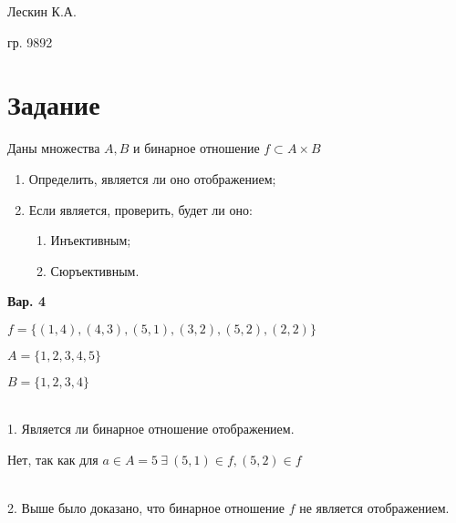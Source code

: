 Лескин К.А.

гр. 9892

\section*{Задание}

Даны множества $ A, B $ и бинарное отношение $ f \subset A \times B $

\begin{enumerate}
	\item Определить, является ли оно отображением;
	\item Если является, проверить, будет ли оно:
	\begin{enumerate}
		\item Инъективным;
		\item Сюръективным.
	\end{enumerate}
\end{enumerate}

\textbf{Вар. 4}

$ f = \{(1, 4),(4, 3),(5, 1),(3, 2),(5, 2),(2, 2)\} $

$ A = \{1, 2, 3, 4, 5\} $

$ B = \{1, 2, 3, 4\} $

\ 
\\

1. Является ли бинарное отношение отображением.

Нет, так как для $ a \in A = 5 \ \exists \ (5, 1) \in f, (5,2) \in f $

\
\\

2. Выше было доказано, что бинарное отношение $ f $ не является отображением.